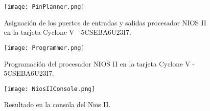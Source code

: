 \begin{figure}[ht]
	\centering
	\texttt{[image: PinPlanner.png]}
	\caption{Asignación de los puertos de entradas y salidas procesador NIOS II en la tarjeta Cyclone V - 5CSEBA6U23I7. \label{fig:pinplanner}}
\end{figure}

\begin{figure}[ht]
	\centering
	\texttt{[image: Programmer.png]}
	\caption{Programación del procesador NIOS II en la tarjeta Cyclone V - 5CSEBA6U23I7. \label{fig:programmer}}
\end{figure}

\begin{figure}[ht]
	\centering
	\texttt{[image: NiosIIConsole.png]}
	\caption{Resultado en la consola del Nios II. \label{fig:niosconsole}}
\end{figure}